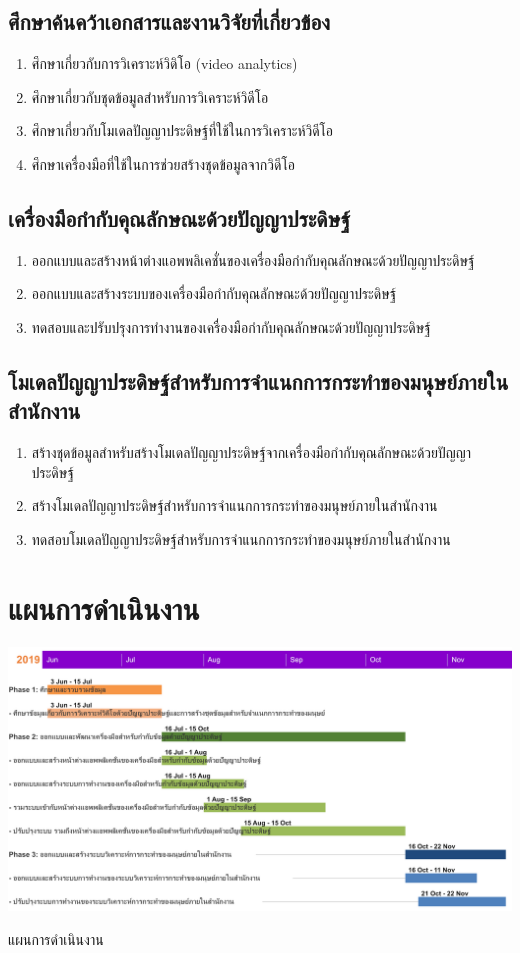 \subsection*{ศึกษาค้นคว้าเอกสารและงานวิจัยที่เกี่ยวข้อง}
\begin{enumerate}\setlength\itemsep{-0.25em}
	\item ศึกษาเกี่ยวกับการวิเคราะห์วิดิโอ (video analytics)
	\item ศึกษาเกี่ยวกับชุดข้อมูลสำหรับการวิเคราะห์วิดีโอ
	\item ศึกษาเกี่ยวกับโมเดลปัญญาประดิษฐ์ที่ใช้ในการวิเคราะห์วิดีโอ
	\item ศึกษาเครื่องมือที่ใช้ในการช่วยสร้างชุดข้อมูลจากวิดีโอ
\end{enumerate}
\subsection*{เครื่องมือกำกับคุณลักษณะด้วยปัญญาประดิษฐ์}
\begin{enumerate}\setlength\itemsep{-0.25em}
	\item ออกแบบและสร้างหน้าต่างแอพพลิเคชั่นของเครื่องมือกำกับคุณลักษณะด้วยปัญญาประดิษฐ์
	\item ออกแบบและสร้างระบบของเครื่องมือกำกับคุณลักษณะด้วยปัญญาประดิษฐ์
	\item ทดสอบและปรับปรุงการทำงานของเครื่องมือกำกับคุณลักษณะด้วยปัญญาประดิษฐ์
\end{enumerate}
\subsection*{โมเดลปัญญาประดิษฐ์สำหรับการจำแนกการกระทำของมนุษย์ภายในสำนักงาน}
\begin{enumerate}\setlength\itemsep{-0.25em}
	\item สร้างชุดข้อมูลสำหรับสร้างโมเดลปัญญาประดิษฐ์จากเครื่องมือกำกับคุณลักษณะด้วยปัญญาประดิษฐ์
	\item สร้างโมเดลปัญญาประดิษฐ์สำหรับการจำแนกการกระทำของมนุษย์ภายในสำนักงาน
	\item ทดสอบโมเดลปัญญาประดิษฐ์สำหรับการจำแนกการกระทำของมนุษย์ภายในสำนักงาน
\end{enumerate}
\clearpage
\section*{แผนการดำเนินงาน}
\begin{table}[!ht]
	\includegraphics[width=1.125\textwidth]{chapter1/ganttchart.png}
	\caption{แผนการดำเนินงาน}
	\label{tab:ganttchart}
\end{table}
\clearpage